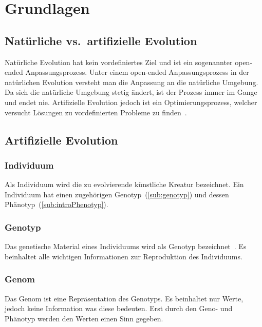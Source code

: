 %
%


\chapter{Grundlagen}

  \section{Natürliche vs.\ artifizielle Evolution}

    Natürliche Evolution hat kein vordefiniertes Ziel und ist ein sogenannter open-ended Anpassungsprozess.
    Unter einem open-ended Anpassungsprozess in der natürlichen Evolution
    versteht man die Anpassung an die natürliche Umgebung.
    Da sich die natürliche Umgebung stetig ändert, ist der Prozess immer im Gange und endet nie.
    Artifizielle Evolution jedoch ist ein Optimierungsprozess,
    welcher versucht Lösungen zu vordefinierten Probleme zu finden~\cite[S.1]{book:bioInspired}.

  \section{Artifizielle Evolution}

    \subsection{Individuum\label{sub:individual}}

      Als Individuum wird die zu evolvierende künstliche Kreatur bezeichnet.
      Ein Individuum hat einen zugehörigen Genotyp~(\vref{sub:genotyp}) und dessen Phänotyp~(\vref{sub:introPhenotyp}).

    \subsection{Genotyp\label{sub:genotyp}}

      Das genetische Material eines Individuums wird als Genotyp bezeichnet~\cite[S.5]{book:bioInspired}.
      Es beinhaltet alle wichtigen Informationen zur Reproduktion des Individuums.

    \subsection{Genom\label{sub:genom}}

      Das Genom ist eine Repräsentation des Genotyps.
      Es beinhaltet nur Werte, jedoch keine Information was diese bedeuten.
      Erst durch den Geno- und Phänotyp werden den Werten einen Sinn gegeben.

